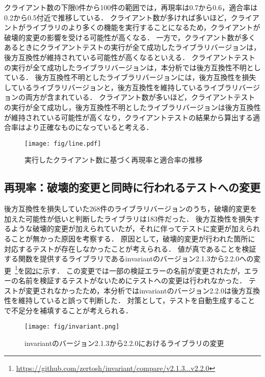 \documentclass[submit]{ipsj}
\begin{document}
クライアント数の下限0件から100件の範囲では，再現率は0.7から0.6，適合率は0.2から0.5付近で推移している．
クライアント数が多ければ多いほど，クライアントがライブラリのより多くの機能を実行することになるため，クライアントが破壊的変更の影響を受ける可能性が高くなる．
一方で，クライアント数が多くあるときにクライアントテストの実行が全て成功したライブラリバージョンは，後方互換性が維持されている可能性が高くなるといえる．
クライアントテストの実行が全て成功したライブラリバージョンは，本分析では後方互換性不明としている．
後方互換性不明としたライブラリバージョンには，後方互換性を損失しているライブラリバージョンと，後方互換性を維持しているライブラリバージョンの両方が含まれている．
クライアント数が多いほど，クライアントテストの実行が全て成功し，後方互換性不明としたライブラリバージョンは後方互換性が維持されている可能性が高くなり，クライアントテストの結果から算出する適合率はより正確なものになっていると考える．

\begin{figure}[h]
  \vspace{1zh}
  \centering
  \texttt{[image: fig/line.pdf]}
  \caption{実行したクライアント数に基づく再現率と適合率の推移}
  \label{fig:line}
\end{figure}

\subsection{再現率：破壊的変更と同時に行われるテストへの変更}
後方互換性を損失していた268件のライブラリバージョンのうち，破壊的変更を加えた可能性が低いと判断したライブラリは183件だった．
後方互換性を損失するような破壊的変更が加えられていたが，それに伴ってテストに変更が加えられることが無かった原因を考察する．
原因として，破壊的変更が行われた箇所に対応するテストが存在しなかったことが考えられる．
値が真であることを検証する関数を提供するライブラリであるinvariantのバージョン2.1.3から2.2.0への変更~\footnote{\url{https://github.com/zertosh/invariant/compare/v2.1.3...v2.2.0}}を図\ref{fig:invariant}に示す．
この変更では一部の検証エラーの名前が変更されたが，エラーの名前を検証するテストがないためにテストへの変更は行われなかった．
テストが変更されなかったため，本分析ではinvariantのバージョン2.2.0は後方互換性を維持していると誤って判断した．
対策として，テストを自動生成することで不足分を補填することが考えられる．

\begin{figure}[h]
  \centering
  \texttt{[image: fig/invariant.png]}
  \caption{invariantのバージョン2.1.3から2.2.0におけるライブラリの変更}
  \label{fig:invariant}
\end{figure}
\end{document}
